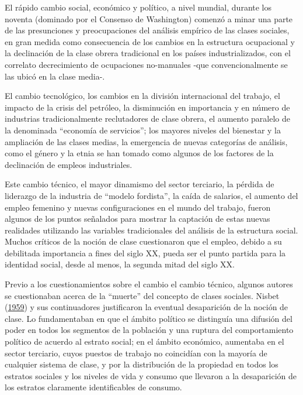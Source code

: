 \documentclass[
]{article}
\begin{document}
El rápido cambio social, económico y político, a nivel mundial, durante los noventa (dominado por el Consenso de Washington) comenzó a minar una parte de las presunciones y preocupaciones del análisis empírico de las clases sociales, en gran medida como consecuencia de los cambios en la estructura ocupacional y la declinación de la clase obrera tradicional en los países industrializados, con el correlato decrecimiento de ocupaciones no-manuales -que convencionalmente se las ubicó en la clase media-.

El cambio tecnológico, los cambios en la división internacional del trabajo, el impacto de la crisis del petróleo, la disminución en importancia y en número de industrias tradicionalmente reclutadores de clase obrera, el aumento paralelo de la denominada ``economía de servicios''; los mayores niveles del bienestar y la ampliación de las clases medias, la emergencia de nuevas categorías de análisis, como el género y la etnia se han tomado como algunos de los factores de la declinación de empleos industriales.

Este cambio técnico, el mayor dinamismo del sector terciario, la pérdida de liderazgo de la industria de ``modelo fordista'', la caída de salarios, el aumento del empleo femenino y nuevas configuraciones en el mundo del trabajo, fueron algunos de los puntos señalados para mostrar la captación de estas nuevas realidades utilizando las variables tradicionales del análisis de la estructura social. Muchos críticos de la noción de clase cuestionaron que el empleo, debido a su debilitada importancia a fines del siglo XX, pueda ser el punto partida para la identidad social, desde al menos, la segunda mitad del siglo XX.

Previo a los cuestionamientos sobre el cambio el cambio técnico, algunos autores se cuestionaban acerca de la ``muerte'' del concepto de clases sociales. Nisbet (\protect\hyperlink{ref-Nisbet1959}{1959}) y sus continuadores justificaron la eventual desaparición de la noción de clase. Lo fundamentaban en que el ámbito político se distinguía una difusión del poder en todos los segmentos de la población y una ruptura del comportamiento político de acuerdo al estrato social; en el ámbito económico, aumentaba en el sector terciario, cuyos puestos de trabajo no coincidían con la mayoría de cualquier sistema de clase, y por la distribución de la propiedad en todos los estratos sociales y los niveles de vida y consumo que llevaron a la desaparición de los estratos claramente identificables de consumo.
\end{document}
